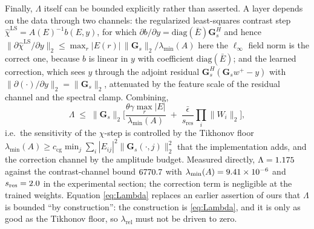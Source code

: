 \documentclass[journal,cmes,article,submit,moreauthors,pdftex]{Definitions/tsp}
\newcommand{\norm}[1]{\lVert #1 \rVert}
\newcommand{\numv}[1]{#1}
\begin{document}
Finally, $\Lambda$ itself can be bounded explicitly rather than asserted. A layer depends on the
data through two channels: the regularized least-squares contrast step
$\hat\chi^{\mathrm{LS}}=A(E)^{-1}b(E,y)$, for which
$\partial b/\partial y=\mathrm{diag}(\bar E)\mathbf{G}_s^{H}$ and hence
$\norm{\partial\hat\chi^{\mathrm{LS}}/\partial y}_2
\le\max_r|E(r)|\,\norm{\mathbf{G}_s}_2/\lambda_{\min}(A)$ here the $\ell_\infty$ field norm is the
correct one, because $b$ is linear in $y$ with coefficient $\mathrm{diag}(\bar E)$; and the learned
correction, which sees $y$
through the adjoint residual $\mathbf{G}_s^{H}(\mathbf{G}_s w^{+}-y)$ with
$\norm{\partial(\cdot)/\partial y}_2=\norm{\mathbf{G}_s}_2$, attenuated by the feature scale of the
residual channel and the spectral clamp. Combining,
\begin{equation}\label{eq:Lambda}
\Lambda\;\le\;\norm{\mathbf{G}_s}_2
\Big[\frac{\theta\gamma\max_r|E|}{\lambda_{\min}(A)}
\;+\;\frac{\bar\epsilon}{s_{\mathrm{res}}}\prod_i\norm{W_i}_2\Big],
\end{equation}
i.e.\ the sensitivity of the $\chi$-step is controlled by the Tikhonov floor
$\lambda_{\min}(A)\ge c_{\mathrm{cg}}\min_j\sum_i|E_{ij}|^{2}\norm{\mathbf{G}_s(\cdot,j)}_2^{2}$ that
the implementation adds, and the correction channel by the amplitude budget. Measured directly,
$\Lambda=\numv{\NumLambdaMeas}$ against the contrast-channel bound $\numv{\NumLambdaBound}$ with
$\lambda_{\min}(A)=\numv{\NumLamMin}$ and $s_{\mathrm{res}}=\numv{\NumScaleRes}$
in the experimental section; the correction term is negligible at the trained weights. Equation
\eqref{eq:Lambda} replaces an earlier assertion of ours that $\Lambda$ is bounded ``by construction'':
the construction is \eqref{eq:Lambda}, and it is only as good as the Tikhonov floor, so
$\lambda_{\mathrm{rel}}$ must not be driven to zero.
\end{document}
